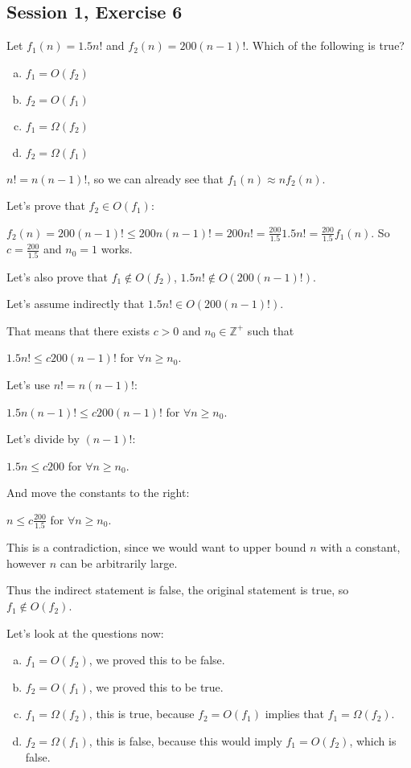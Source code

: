 \subsection{Session 1, Exercise 6}


Let $f_1(n) = 1.5n!$ and $f_2(n)=200(n-1)!$. Which of the following is true?

\begin{enumerate}[a.)]
    \item $f_1=O(f_2)$
    \item $f_2=O(f_1)$
    \item $f_1=\Omega(f_2)$
    \item $f_2=\Omega(f_1)$
\end{enumerate}


$n! = n(n-1)!$, so we can already see that $f_1(n) \approx nf_2(n)$.

Let's prove that $f_2 \in{} O(f_1)$:

$f_2(n) = 200(n-1)! \leq{} 200n(n-1)! = 200n! = \frac{200}{1.5}1.5n! = \frac{200}{1.5}f_1(n)$. So $c=\frac{200}{1.5}$ and $n_0=1$ works.

Let's also prove that $f_1 \notin{} O(f_2)$, $1.5n! \notin{} O(200(n-1)!)$.

Let's assume indirectly that $1.5n! \in{} O(200(n-1)!)$.

That means that there exists $c>0$ and $n_0\in{}\mathds{Z}^+$ such that

$1.5n! \leq{} c200(n-1)!$ for $\forall{}n\geq{}n_0$.

Let's use $n!=n(n-1)!$:

$1.5n(n-1)! \leq{} c200(n-1)!$ for $\forall{}n\geq{}n_0$.

Let's divide by $(n-1)!$:

$1.5n \leq{} c200$ for $\forall{}n\geq{}n_0$.

And move the constants to the right:

$n \leq{} c\frac{200}{1.5}$ for $\forall{}n\geq{}n_0$.

This is a contradiction, since we would want to upper bound $n$ with a constant, however $n$ can be arbitrarily large.

Thus the indirect statement is false, the original statement is true, so $f_1 \notin{} O(f_2)$.

Let's look at the questions now:

\begin{enumerate}[a.)]
    \item $f_1=O(f_2)$, we proved this to be false.
    \item $f_2=O(f_1)$, we proved this to be true.
    \item $f_1=\Omega(f_2)$, this is true, because $f_2=O(f_1)$ implies that $f_1=\Omega(f_2)$.
    \item $f_2=\Omega(f_1)$, this is false, because this would imply $f_1=O(f_2)$, which is false.
\end{enumerate}


